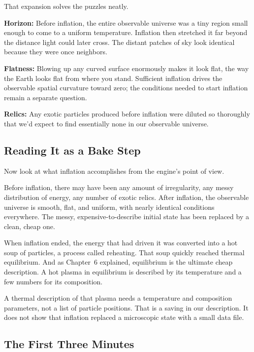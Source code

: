 That expansion solves the puzzles neatly.

\begin{compactchecklist}
\item \textbf{Horizon:} Before inflation, the entire observable universe was a tiny region small enough to come to a uniform temperature. Inflation then stretched it far beyond the distance light could later cross. The distant patches of sky look identical because they were once neighbors.
\item \textbf{Flatness:} Blowing up any curved surface enormously makes it look flat, the way the Earth looks flat from where you stand. Sufficient inflation drives the observable spatial curvature toward zero; the conditions needed to start inflation remain a separate question.
\item \textbf{Relics:} Any exotic particles produced before inflation were diluted so thoroughly that we'd expect to find essentially none in our observable universe.
\end{compactchecklist}

\subsection{Reading It as a Bake Step}

Now look at what inflation accomplishes from the engine's point of view.

Before inflation, there may have been any amount of irregularity, any messy distribution of energy, any number of exotic relics. After inflation, the observable universe is smooth, flat, and uniform, with nearly identical conditions everywhere. The messy, expensive-to-describe initial state has been replaced by a clean, cheap one.

When inflation ended, the energy that had driven it was converted into a hot soup of particles, a process called reheating. That soup quickly reached thermal equilibrium. And as Chapter~6 explained, equilibrium is the ultimate cheap description. A hot plasma in equilibrium is described by its temperature and a few numbers for its composition.

A thermal description of that plasma needs a temperature and composition parameters, not a list of particle positions. That is a saving in our description. It does not show that inflation replaced a microscopic state with a small data file.

\subsection{The First Three Minutes}

